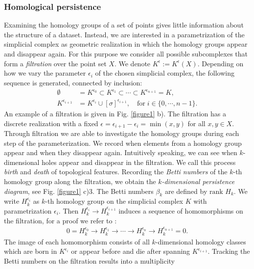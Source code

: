 \documentclass[runningheads,orivec]{llncs}
\begin{document}
\subsubsection{Homological persistence} Examining the homology groups of a set of points gives little information about the structure of a dataset. Instead, we are interested in a parametrization of the simplicial complex as geometric realization in which the homology groups appear and disappear again. For this purpose we consider all possible subcomplexes that form a \emph{filtration} over the point set $X$. We denote $K^{\epsilon} := K^{\epsilon}(X)$. Depending on how we vary the parameter $\epsilon_i$ of the chosen simplicial complex, the following sequence is generated, connected by inclusion:
\begin{align}
    \emptyset &= K^{\epsilon_0} \subset K^{\epsilon_1} \subset \cdots \subset K^{\epsilon_{n+1}}= K,\\
    K^{\epsilon_{i+1}} &= K^{\epsilon_i} \cup [\sigma]^{\epsilon_{i+1}}, \quad \text{for} \; i \in \{0, \cdots, n-1\}.
\end{align}
An example of a filtration is given in Fig. \ref{figure1} b). The filtration has a discrete realization with a fixed $\epsilon = \epsilon_{i+1}-\epsilon_{i} = \min(x,y)$ for all $x,y \in X$. Through filtration we are able to investigate the homology groups during each step of the parameterization. We record when elements from a homology group appear and when they disappear again. Intuitively speaking, we can see when $k$-dimensional holes appear and disappear in the filtration. We call this process \emph{birth} and \emph{death} of topological features. Recording the \emph{Betti numbers} of the $k$-th homology group along the filtration, we obtain the \emph{$k$-dimensional persistence diagram}, see Fig. \ref{figure1} c)3. The Betti numbers $\beta_k$ are defined by $\text{rank } H_k$. We write $H^{\epsilon_i}_k$ as $k$-th homology group on the simplicial complex $K$ with parametrization $\epsilon_i$. Then $H^{\epsilon_{i}}_{k} \rightarrow H^{\epsilon_{i+1}}_k$ induces a sequence of homomorphisms on the filtration, for a proof we refer to \cite{edelsbrunner2008persistent}:
\begin{align}
0 = H^{\epsilon_{0}}_k \rightarrow H^{\epsilon_{1}}_k \rightarrow \cdots \rightarrow H^{\epsilon_{n}}_k \rightarrow H^{\epsilon_{n+1}}_k = 0.
\end{align}
The image of each homomorphism consists of all $k$-dimensional homology classes which are born in $K^{\epsilon_i}$ or appear before and die after spanning $K^{\epsilon_{i+1}}$. Tracking the Betti numbers on the filtration results into a multiplicity
\end{document}
